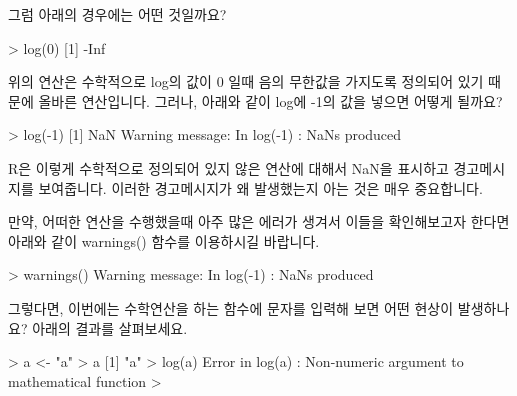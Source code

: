 그럼 아래의 경우에는 어떤 것일까요?

\begin{Schunk}
\begin{Soutput}
> log(0)
[1] -Inf
\end{Soutput}
\end{Schunk}

위의 연산은 수학적으로 log의 값이 0 일때 음의 무한값을 가지도록 정의되어 있기 때문에 올바른 연산입니다. 
그러나, 아래와 같이 log에 -1의 값을 넣으면 어떻게 될까요?

\begin{Schunk}
\begin{Soutput}
> log(-1)
[1] NaN
Warning message:
In log(-1) : NaNs produced

% 한글로는 2.15.3 버전에서

% 경고 메세지가 손실되었습니다
% In log(-1): NaNs가 생성되었습니다

% 라고 나오거덩... 메세지가 손실되었습니다란 표현이 정확하지 않은 거 같아..
% 요러면 사람들이 이 뜻이 뭔가를 또 고민하게 되지...

\end{Soutput}
\end{Schunk}

R은 이렇게 수학적으로 정의되어 있지 않은 연산에 대해서 NaN을 표시하고 경고메시지를 보여줍니다. 
이러한 경고메시지가 왜 발생했는지 아는 것은 매우 중요합니다. 

만약, 어떠한 연산을 수행했을때 아주 많은 에러가 생겨서 이들을 확인해보고자 한다면 아래와 같이 warnings() 함수를 이용하시길 바랍니다. 

\begin{Schunk}
\begin{Soutput}
> warnings()
Warning message:
In log(-1) : NaNs produced

% 경고매시지:
% In log(-1): NaNs가 생성되었습니다

% 위 거랑 비교하면 에러 메세지에 문제 있지?

\end{Soutput}
\end{Schunk}

그렇다면, 이번에는 수학연산을 하는 함수에 문자를 입력해 보면 어떤 현상이 발생하나요? 
아래의 결과를 살펴보세요.

\begin{Schunk}
\begin{Soutput}
> a <- "a"
> a
[1] "a"
> log(a)
Error in log(a) : Non-numeric argument to mathematical function
> 
\end{Soutput}
\end{Schunk}

